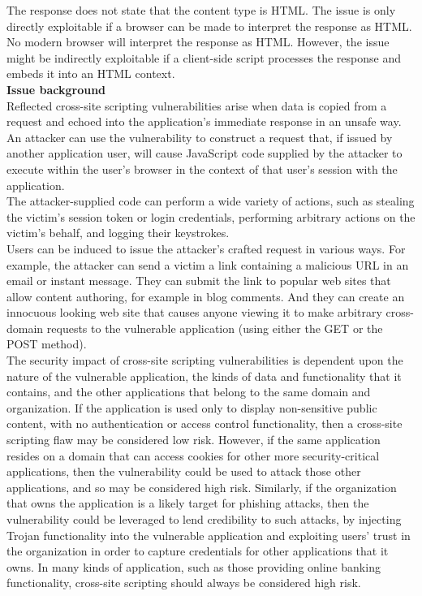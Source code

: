 \begin{itemize}
The response does not state that the content type is HTML. The issue is only directly exploitable if a browser can be made to interpret the response as HTML. No modern browser will interpret the response as HTML. However, the issue might be indirectly exploitable if a client-side script processes the response and embeds it into an HTML context. \\

\textbf{Issue background} \\
Reflected cross-site scripting vulnerabilities arise when data is copied from a request and echoed into the application's immediate response in an unsafe way. An attacker can use the vulnerability to construct a request that, if issued by another application user, will cause JavaScript code supplied by the attacker to execute within the user's browser in the context of that user's session with the application. \\

The attacker-supplied code can perform a wide variety of actions, such as stealing the victim's session token or login credentials, performing arbitrary actions on the victim's behalf, and logging their keystrokes. \\

Users can be induced to issue the attacker's crafted request in various ways. For example, the attacker can send a victim a link containing a malicious URL in an email or instant message. They can submit the link to popular web sites that allow content authoring, for example in blog comments. And they can create an innocuous looking web site that causes anyone viewing it to make arbitrary cross-domain requests to the vulnerable application (using either the GET or the POST method). \\

The security impact of cross-site scripting vulnerabilities is dependent upon the nature of the vulnerable application, the kinds of data and functionality that it contains, and the other applications that belong to the same domain and organization. If the application is used only to display non-sensitive public content, with no authentication or access control functionality, then a cross-site scripting flaw may be considered low risk. However, if the same application resides on a domain that can access cookies for other more security-critical applications, then the vulnerability could be used to attack those other applications, and so may be considered high risk. Similarly, if the organization that owns the application is a likely target for phishing attacks, then the vulnerability could be leveraged to lend credibility to such attacks, by injecting Trojan functionality into the vulnerable application and exploiting users' trust in the organization in order to capture credentials for other applications that it owns. In many kinds of application, such as those providing online banking functionality, cross-site scripting should always be considered high risk. \\


\end{itemize}

